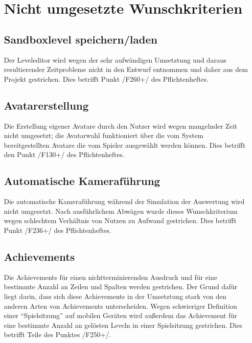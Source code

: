 \chapter{Nicht umgesetzte Wunschkriterien}

\section{Sandboxlevel speichern/laden}
	Der Leveleditor wird wegen der sehr aufwändigen Umsetztung und daraus resultierender Zeitprobleme 
nicht in den Entwurf entnommen und daher aus dem Projekt gestrichen. Dies betrifft Punkt /F260+/ des Pflichtenheftes.  
 
\section{Avatarerstellung}
Die Erstellung eigener Avatare durch den Nutzer wird wegen mangelnder Zeit nicht umgesetzt; die Avatarwahl funktioniert 
über die vom System bereitgestellten Avatare die vom Spieler ausgewählt werden können. Dies betrifft 
den Punkt /F130+/ des Pflichtenheftes.  

\section{Automatische Kameraführung}
Die automatische Kameraführung während der Simulation der Auswertung wird nicht umgesetzt. Nach 
ausführlichem Abwägen wurde dieses Wunschkriterium wegen schlechtem Verhältnis von Nutzen zu Aufwand 
gestrichen. Dies betrifft Punkt /F236+/ des Pflichtenheftes. 

\section{Achievements}
Die Achievements für einen nichtterminierenden Ausdruck und für eine bestimmte Anzahl an Zeilen und Spalten 
werden gestrichen. Der Grund dafür liegt darin, dass sich diese Achievements in der Umsetztung stark von den
anderen Arten von Achievements unterscheiden. Wegen schwieriger Definition einer ``Spielsitzung'' auf mobilen Geräten wird außerdem das Achievement für eine bestimmte Anzahl an gelösten Leveln in einer Spielsitzung gestrichen.
Dies betrifft Teile des Punktes /F250+/.  